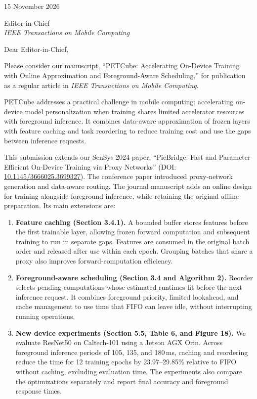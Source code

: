 \documentclass[11pt,letterpaper]{article}
\begin{document}
15 November 2026

Editor-in-Chief\\
\textit{IEEE Transactions on Mobile Computing}

Dear Editor-in-Chief,

Please consider our manuscript, ``PETCube: Accelerating On-Device Training with Online Approximation and Foreground-Aware Scheduling,'' for publication as a regular article in \textit{IEEE Transactions on Mobile Computing}.

PETCube addresses a practical challenge in mobile computing: accelerating on-device model personalization when training shares limited accelerator resources with foreground inference. It combines data-aware approximation of frozen layers with feature caching and task reordering to reduce training cost and use the gaps between inference requests.

This submission extends our SenSys 2024 paper, ``PieBridge: Fast and Parameter-Efficient On-Device Training via Proxy Networks'' (DOI: \href{https://doi.org/10.1145/3666025.3699327}{10.1145/3666025.3699327}). The conference paper introduced proxy-network generation and data-aware routing. The journal manuscript adds an online design for training alongside foreground inference, while retaining the original offline preparation. Its main extensions are:

\begin{enumerate}[leftmargin=16pt,itemsep=4pt,parsep=0pt,topsep=2pt]
\item \textbf{Feature caching (Section 3.4.1).} A bounded buffer stores features before the first trainable layer, allowing frozen forward computation and subsequent training to run in separate gaps. Features are consumed in the original batch order and released after use within each epoch. Grouping batches that share a proxy also improves forward-computation efficiency.

\item \textbf{Foreground-aware scheduling (Section 3.4 and Algorithm 2).} Reorder selects pending computations whose estimated runtimes fit before the next inference request. It combines foreground priority, limited lookahead, and cache management to use time that FIFO can leave idle, without interrupting running operations.

\item \textbf{New device experiments (Section 5.5, Table 6, and Figure 18).} We evaluate ResNet50 on Caltech-101 using a Jetson AGX Orin. Across foreground inference periods of 105, 135, and 180\,ms, caching and reordering reduce the time for 12 training epochs by 23.97--29.85\% relative to FIFO without caching, excluding evaluation time. The experiments also compare the optimizations separately and report final accuracy and foreground response times.
\end{enumerate}
\end{document}
